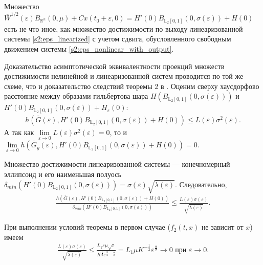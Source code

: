 \documentclass[../main.tex]{subfiles}
\begin{document}
 Множество $\overline{W}^{1/2}(\varepsilon)B_{\mathbb{R}^n}(0,\mu) + Cx(t_0+\varepsilon,0) = H'(0)B_{\mathbb{L}_2[0,1]}(0,\sigma(\varepsilon))+ H(0)$ есть не что иное, как множество достижимости по выходу линеаризованной системы \eqref{s2:eps_linearized} с учетом сдвига, обусловленного свободным движением системы \eqref{s2:eps_nonlinear_with_output}.
 
 Доказательство асимптотической эквивалентности проекций множеств достижимости нелинейной и линеаризованной систем проводится по той же схеме, что и доказательство следствий теоремы 2 в \cite{GusevUMJ}. 
Оценим сверху хаусдорфово расстояние между образами гильбертова шара $ H\left( B_{\mathbb{L}_2[0,1]}(0,\sigma(\varepsilon))\right) $ и $ H'(0)B_{\mathbb{L}_2[0,1]}(0,\sigma(\varepsilon))+ H_{\varepsilon}(0) $:
 \begin{gather*}
 h\left( \overline{G}(\varepsilon), H'(0)B_{\mathbb{L}_2[0,1]}(0,\sigma(\varepsilon))+ H(0)\right) \leqslant L(\varepsilon) \sigma^2(\varepsilon).
 \end{gather*}
 А так как $ \lim\limits_{\varepsilon \rightarrow 0} L(\varepsilon) \sigma^2(\varepsilon) = 0 $, то и $ \lim\limits_{\varepsilon \rightarrow 0} h\left( \overline{G}_y(\varepsilon), H'(0)B_{\mathbb{L}_2[0,1]}(0,\sigma(\varepsilon))+ H(0)\right) = 0 $.
 
 
 Множество достижимости линеаризованной системы --- конечномерный эллипсоид и его наименьшая полуось $ \delta_{min}\left(H'(0)B_{\mathbb{L}_2[0,1]}(0,\sigma(\varepsilon)) \right)=\sigma(\varepsilon)\sqrt{\overline{\lambda}(\varepsilon)} $. 
 Следовательно,
 \begin{gather*}
 \frac{h\left(\overline{G}(\varepsilon), H'(0)B_{\mathbb{L}_2[0,1]}(0,\sigma(\varepsilon))+ H(0)\right) }{\delta_{min}\left( H'(0)B_{\mathbb{L}_2[0,1]}(0,\sigma(\varepsilon))\right) } \leqslant \frac{L(\varepsilon) \sigma(\varepsilon)}{\sqrt{\overline{\lambda}(\varepsilon)}}.
 \end{gather*}
 
 При выполнении условий теоремы в первом случае ($ f_2(t,x) $ не зависит от $ x $) имеем
 \begin{gather*}
 \frac{L(\varepsilon) \sigma(\varepsilon)}{\sqrt{\overline{\lambda}(\varepsilon)}} 
 \leqslant
 \frac{L_1\varepsilon\mu\sqrt{\varepsilon}}{K^{\frac{1}{2}}\varepsilon^{\frac{3}{2}-\frac{\alpha}{2}}} 
 =
 L_1\mu K^{-\frac{1}{2}}\varepsilon^{\frac{\alpha}{2}} \rightarrow 0 \mbox{\ при\ } \varepsilon \rightarrow 0.
 \end{gather*}
 
\end{document}
